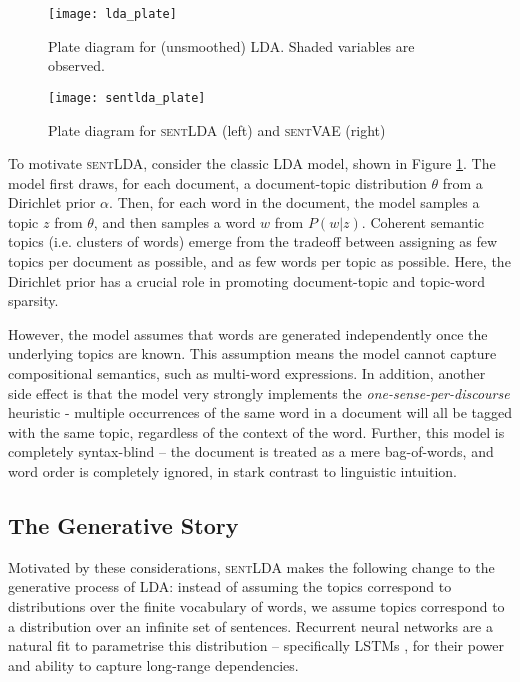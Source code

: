 \begin{figure}
    \centering
    \texttt{[image: lda\_plate]}
    \caption{Plate diagram for (unsmoothed) LDA. Shaded variables are observed.}
    \label{fig:lda_plate}
    \vspace{-1em}
\end{figure}

\begin{figure}
    \centering
    \texttt{[image: sentlda\_plate]}
    \caption{Plate diagram for \textsc{sentLDA} (left) and \textsc{sentVAE} (right)}
    \label{fig:sentlda_plate}
\end{figure}

To motivate \textsc{sentLDA}, consider the classic LDA model, shown in Figure \ref{fig:lda_plate}. The model first draws, for each document, a document-topic distribution $\theta$ from a Dirichlet prior $\alpha$. Then, for each word in the document, the model samples a topic $z$ from $\theta$, and then samples a word $w$ from $P(w | z)$. Coherent semantic topics (i.e. clusters of words) emerge from the tradeoff between assigning as few topics per document as possible, and as few words per topic as possible. Here, the Dirichlet prior has a crucial role in promoting document-topic and topic-word sparsity.

However, the model assumes that words are generated independently once the underlying topics are known. This assumption means the model cannot capture compositional semantics, such as multi-word expressions. In addition, another side effect is that the model very strongly implements the \textit{one-sense-per-discourse} heuristic - multiple occurrences of the same word in a document will all be tagged with the same topic, regardless of the context of the word. Further, this model is completely syntax-blind -- the document is treated as a mere bag-of-words, and word order is completely ignored, in stark contrast to linguistic intuition.

\subsection{The Generative Story}

Motivated by these considerations, \textsc{sentLDA} makes the following change to the generative process of LDA: instead of assuming the topics correspond to distributions over the finite vocabulary of words, we assume topics correspond to a distribution over an infinite set of sentences. Recurrent neural networks are a natural fit to parametrise this distribution -- specifically LSTMs \citep{Hochreiter:97}, for their power and ability to capture long-range dependencies. 

